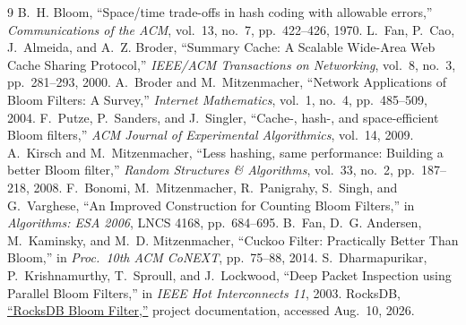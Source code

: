 \documentclass[11pt,a4paper]{article}
\begin{document}
\begin{thebibliography}{9}
 B.~H. Bloom, ``Space/time trade-offs in hash coding with
allowable errors,'' \emph{Communications of the ACM}, vol.~13, no.~7,
pp.~422--426, 1970.
 L.~Fan, P.~Cao, J.~Almeida, and A.~Z. Broder, ``Summary
Cache: A Scalable Wide-Area Web Cache Sharing Protocol,'' \emph{IEEE/ACM
Transactions on Networking}, vol.~8, no.~3, pp.~281--293, 2000.
 A.~Broder and M.~Mitzenmacher, ``Network Applications of
Bloom Filters: A Survey,'' \emph{Internet Mathematics}, vol.~1, no.~4,
pp.~485--509, 2004.
 F.~Putze, P.~Sanders, and J.~Singler, ``Cache-, hash-, and
space-efficient Bloom filters,'' \emph{ACM Journal of Experimental
Algorithmics}, vol.~14, 2009.
 A.~Kirsch and M.~Mitzenmacher, ``Less hashing, same
performance: Building a better Bloom filter,'' \emph{Random Structures \&
Algorithms}, vol.~33, no.~2, pp.~187--218, 2008.
 F.~Bonomi, M.~Mitzenmacher, R.~Panigrahy, S.~Singh, and
G.~Varghese, ``An Improved Construction for Counting Bloom Filters,'' in
\emph{Algorithms: ESA 2006}, LNCS 4168, pp.~684--695.
 B.~Fan, D.~G. Andersen, M.~Kaminsky, and M.~D.
Mitzenmacher, ``Cuckoo Filter: Practically Better Than Bloom,'' in
\emph{Proc.\ 10th ACM CoNEXT}, pp.~75--88, 2014.
 S.~Dharmapurikar, P.~Krishnamurthy, T.~Sproull, and
J.~Lockwood, ``Deep Packet Inspection using Parallel Bloom Filters,'' in
\emph{IEEE Hot Interconnects 11}, 2003.
 RocksDB,
\href{https://github.com/facebook/rocksdb/wiki/RocksDB-Bloom-Filter}
{``RocksDB Bloom Filter,''} project documentation, accessed Aug.~10, 2026.
\end{thebibliography}
\end{document}
